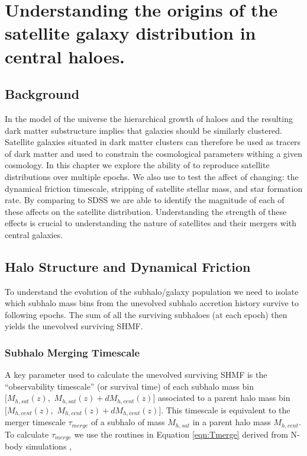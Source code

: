
\chapter{Understanding the origins of the satellite galaxy distribution in central haloes.} 
\label{Chapter:GalDist}

\section{Background}
In the \LCDM model of the universe the hierarchical growth of haloes and the resulting dark matter substructure implies that galaxies should be similarly clustered. Satellite galaxies situated in dark matter clusters can therefore be used as tracers of dark matter and used to constrain the cosmological parameters withing a given \LCDM cosmology.
In this chapter we explore the ability of \steel to reproduce satellite distributions over multiple epochs. We also use \steel to test the affect of changing: the dynamical friction timescale, stripping of satellite stellar mass, and star formation rate. By comparing to SDSS we are able to identify the magnitude of each of these affects on the satellite distribution. Understanding the strength of these effects is crucial to understanding the nature of satellites and their mergers with central galaxies.  

\section{Halo Structure and Dynamical Friction}

To understand the evolution of the subhalo/galaxy population we need to isolate which subhalo mass bins from the unevolved subhalo accretion history survive to following epochs. The sum of all the surviving subhaloes (at each epoch) then yields the  unevolved surviving SHMF. 

\subsection{Subhalo Merging Timescale}
\label{sec:Timescale}
 A key parameter used to calculate the unevolved surviving SHMF is the ``observability timescale'' (or survival time) of each  subhalo mass bin $[M_{h,sat}(z),$ $M_{h,sat}(z) + dM_{h,cent}(z)]$ associated to a parent halo mass bin $[M_{h,cent}(z),$ $M_{h,cent}(z) + dM_{h,cent}(z)]$. This timescale is equivalent to the merger timescale $\tau_{merge}$ of a subhalo of mass $M_{h,sat}$ in a parent halo mass $M_{h,cent}$. To calculate $\tau_{merge}$ we use the routines in Equation \ref{eqn:Tmerge} derived from N-body simulations \citep{Boylan-Kolchin2008},

